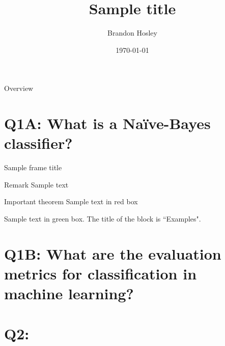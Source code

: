 \documentclass{beamer}
\title{Sample title}
\author{Brandon Hosley}
\institute{University of Illinois - Springfield}
\date{\today}
\begin{document}
\frame{\titlepage}

\begin{frame}{Overview}
\tableofcontents
\end{frame}

\section[Q1.1]{Q1A: What is a Na\"{i}ve-Bayes classifier?}

\begin{frame}{Sample frame title}
\begin{block}{Remark}
	Sample text
\end{block}

\begin{alertblock}{Important theorem}
	Sample text in red box
\end{alertblock}

\begin{examples}
	Sample text in green box. The title of the block is ``Examples".
\end{examples}

\end{frame}

\section[Q1.2]{Q1B: What are the evaluation metrics for classification in machine learning?}

\section[Q2]{Q2: }
\end{document}
